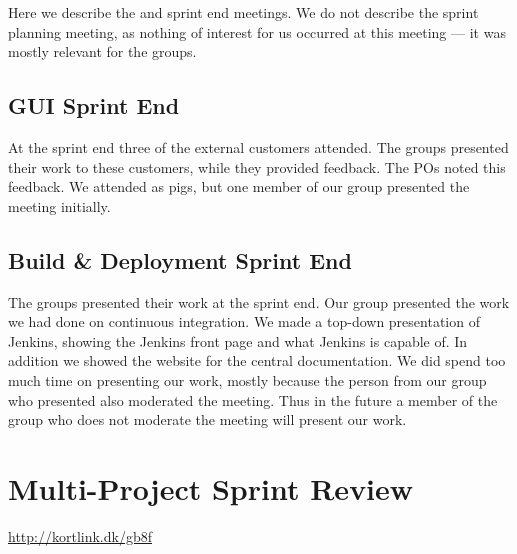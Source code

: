 Here we describe the \gui and \bd sprint end meetings. We do not describe the \db sprint planning meeting, as nothing of interest for us occurred at this meeting --- it was mostly relevant for the \gui groups.

\subsection{GUI Sprint End}
At the \gui sprint end three of the external customers attended. The \gui groups presented their work to these customers, while they provided feedback. The \gui POs noted this feedback. We attended as pigs, but one member of our group presented the meeting initially.

\subsection{Build \& Deployment Sprint End}
The \bd groups presented their work at the \bd sprint end. Our group presented the work we had done on continuous integration. We made a top-down presentation of Jenkins, showing the Jenkins front page and what Jenkins is capable of. In addition we showed the website for the central documentation. We did spend too much time on presenting our work, mostly because the person from our group who presented also moderated the meeting. Thus in the future a member of the group who does not moderate the meeting will present our work.

\section{Multi-Project Sprint Review}

\url{http://kortlink.dk/gb8f}
